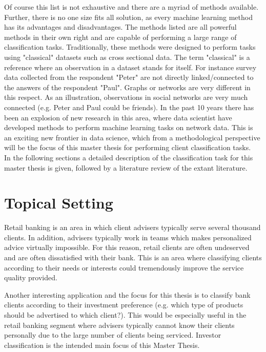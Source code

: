 	\noindent Of course this list is not exhaustive and there are a myriad of methods available. Further, there is no one size fits all solution, 
	as every machine learning method has its advantages and disadvantages. The methods listed are all powerful methods in their own right and are
	capable of performing a large range of classification tasks. Traditionally, these methods were designed to perform tasks using "classical" 
	datasets such as cross sectional data. The term "classical" is a reference where an observation in a dataset stands for itself. For instance survey
	data collected from the respondent "Peter" are not directly linked/connected to the answers of the respondent "Paul". Graphs or networks are very
	different in this respect. As an illustration, observations in social networks are very much connected (e.g. Peter and Paul could be friends). In
	the past 10 years there has been an explosion of new research in this area, where data scientist have developed methods to perform machine learning 
	tasks on network data. This is an exciting new frontier in data science, which from a methodological perspective will be the focus of this master 
	thesis for performing client classification tasks. \\

	\noindent In the following sections a detailed description of the classification task for this master thesis is given, followed by a literature
	review of the extant literature. 


	\section{Topical Setting}

	Retail banking is an area in which client advisers typically serve several thousand clients. In addition, advisers typically work in teams which 
	makes personalized advice virtually impossible. For this reason, retail clients are often undeserved and are often dissatisfied with their bank. 
	This is an area where classifying clients according to their needs or interests could tremendously improve the service quality provided. 



	Another interesting application and the focus for this thesis is to classify bank clients according to their investment preference 
	(e.g. which type of products should be advertised to which client?). This would be especially useful in the retail banking segment where advisers 
	typically cannot know their clients personally due to the large number of clients being serviced. Investor classification is the intended main focus
	of this Master Thesis. \\

